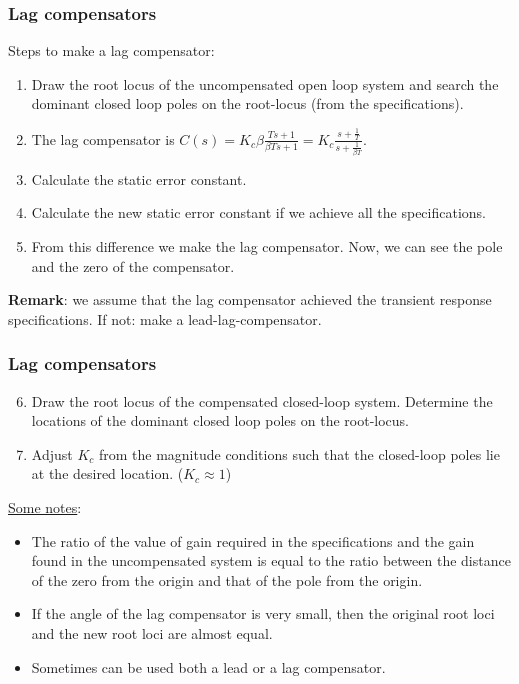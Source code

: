 \begin{frame}
	\frametitle{Lag compensators}
		Steps to make a lag compensator:
		\begin{enumerate}
			\item Draw the root locus of the uncompensated open loop system and search the dominant closed loop poles on the root-locus (from the specifications).
			\item The lag compensator is $C(s)=K_c \beta\frac{Ts+1}{\beta Ts+1}= K_c\frac{s+\frac{1}{T}}{s+\frac{1}{\beta T}}$.
			\item Calculate the static error constant. 
			\item Calculate the new static error constant if we achieve all the specifications.
			\item From this difference we make the lag compensator. Now, we can see the pole and the zero of the compensator. 
		\end{enumerate}
		\textbf{Remark}: we assume that the lag compensator achieved the transient response specifications. If not: make a lead-lag-compensator.
\end{frame}

\begin{frame}
	\frametitle{Lag compensators}
		\begin{enumerate}
			\setcounter{enumi}{5}
			\item Draw the root locus of the compensated closed-loop system. Determine the locations of the dominant closed loop poles on the root-locus. 
			\item Adjust $K_c$ from the magnitude conditions such that the closed-loop poles lie at the desired location. ($K_c\approx 1$)
		\end{enumerate}
		\vspace{3mm}
		
		\underline{Some notes}:
		\begin{itemize}
			\item The ratio of the value of gain required in the specifications and the gain found in the uncompensated system is equal to the ratio between the distance of the zero from the origin and that of the pole from the origin.
			\item If the angle of the lag compensator is very small, then the original root loci and the new root loci are almost equal.
			\item Sometimes can be used both a lead or a lag compensator. 
		\end{itemize}
\end{frame}

